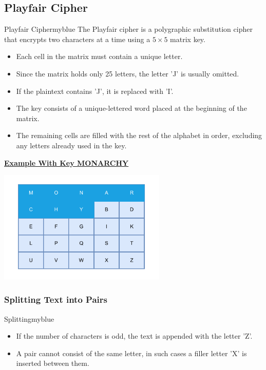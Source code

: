 \subsection{Playfair Cipher}
\begin{prettyBox}{Playfair Cipher}{myblue}
The Playfair cipher is a polygraphic substitution cipher that encrypts two characters at a time using a \(5 \times 5\) matrix key.

\begin{itemize}
    \item Each cell in the matrix must contain a unique letter.
    \item Since the matrix holds only 25 letters, the letter 'J' is usually omitted.
    \item If the plaintext contains 'J', it is replaced with 'I'.
    \item The key consists of a unique-lettered word placed at the beginning of the matrix.
    \item The remaining cells are filled with the rest of the alphabet in order, excluding any letters already used in the key.
\end{itemize}
\end{prettyBox}

\newpage
\textbf{\underline{Example With Key MONARCHY}}

\begin{center}
    \includegraphics[width=0.6\textwidth]{Chapters/Diagram/Crypto/playfair.drawio.pdf}
\end{center}

\vspace{1cm}


\subsubsection{Splitting Text into Pairs}
\begin{prettyBox}{Splitting}{myblue}
\begin{itemize}
    \item If the number of characters is odd, the text is appended
with the letter 'Z'.
    \item A pair cannot consist of the same letter, in such cases a filler
letter 'X' is inserted between them.
\end{itemize}
\end{prettyBox}

